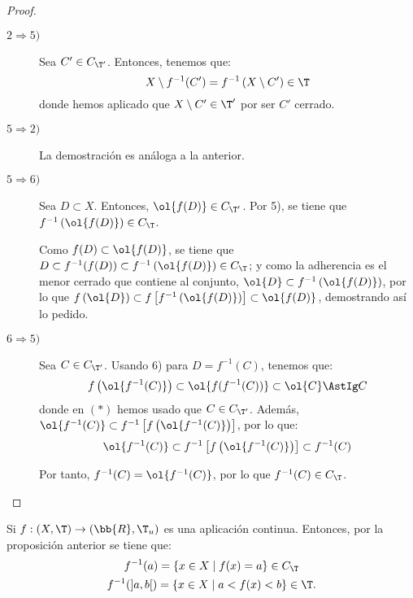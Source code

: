 \begin{proof}
\begin{description}
        \item[$2\Longrightarrow 5)$] Sea $C'\in C_{\T'}$. Entonces, tenemos que:
        \begin{equation*}
            X\setminus f^{-1}(C')=f^{-1}\left(X\setminus C'\right)\in \T
        \end{equation*}
        donde hemos aplicado que $X\setminus C'\in \T'$ por ser $C'$ cerrado.

        \item[$5\Longrightarrow 2)$] La demostración es análoga a la anterior.

        \item[$5\Longrightarrow 6)$] Sea $D\subset X$. Entonces, $\ol{f(D)}\in C_{\T'}$. Por 5), se tiene que $f^{-1}\left(\ol{f(D)}\right)\in C_\T$.

        Como $f(D)\subset \ol{f(D)}$, se tiene que $D\subset f^{-1}(f(D))\subset f^{-1}\left(\ol{f(D)}\right)\in C_\T$; y como la adherencia es el menor cerrado que contiene al conjunto, $\ol{D}\subset f^{-1}\left(\ol{f(D)}\right)$, por lo que $f\left(\ol{D}\right)\subset f\left[f^{-1}\left(\ol{f(D)}\right)\right]\subset \ol{f(D)}$, demostrando así lo pedido.
        
        \item[$6\Longrightarrow 5)$] Sea $C\in C_{\T'}$. Usando 6) para $D=f^{-1}(C)$, tenemos que: $$f\left(\ol{f^{-1}(C)}\right)\subset \ol{f(f^{-1}(C))}\subset \ol{C}\AstIg C$$
        donde en $(\ast)$ hemos usado que $C\in C_{\T'}$. Además, $\ol{f^{-1}(C)}\subset f^{-1}\left[f\left(\ol{f^{-1}(C)}\right)\right]$, por lo que:
        \begin{equation*}
            \ol{f^{-1}(C)}\subset f^{-1}\left[f\left(\ol{f^{-1}(C)}\right)\right] \subset f^{-1}(C)
        \end{equation*}
        

        Por tanto, $f^{-1}(C)=\ol{f^{-1}(C)}$, por lo que $f^{-1}(C)\in C_\T$.
        
    \end{description}
\end{proof}


\begin{observacion}
    Si $f:(X,\T)\to (\bb{R},\T_u)$ es una aplicación continua. Entonces, por la proposición anterior se tiene que:
    \begin{gather*}
        f^{-1}(a)=\{x\in X\mid f(x)=a\}\in C_\T\\
        f^{-1}(]a,b[)=\{x\in X\mid a<f(x)<b\}\in \T.
    \end{gather*}
\end{observacion}

